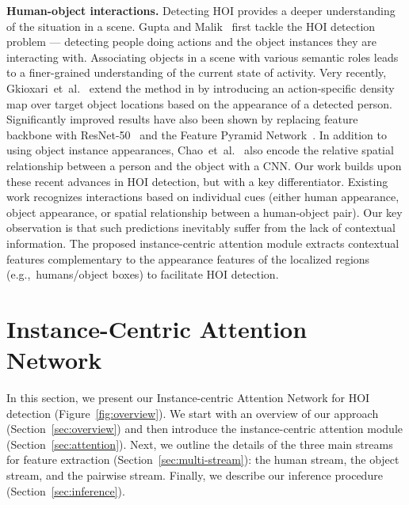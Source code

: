\documentclass{bmvc2k}
\def\etal{et~al.}			  \def\eg{e.g.,~}               \def\ie{i.e.,~}               \def\etc{etc}                 \def\cf{cf.~}                 \def\viz{viz.~}               \def\vs{vs.~}
\newlength\secmargin
\newcommand {\para}[1]{\vspace{1.5mm} \noindent \textbf{#1}}
\newcommand{\secref}[1]{Section~\ref{sec:#1}}
\newcommand{\figref}[1]{Figure~\ref{fig:#1}}
\begin{document}
\para{Human-object interactions.}
Detecting HOI provides a deeper understanding of the situation in a scene. 
Gupta and Malik~\cite{Gupta-SemanticRoleLabeling} first tackle the HOI detection problem --- detecting people doing actions and the object instances they are interacting with.
Associating objects in a scene with various semantic roles leads to a finer-grained understanding of the current state of activity. 
Very recently, Gkioxari~\etal~\cite{Gkioxari-CVPR-InteractNet} extend the method in \cite{Gupta-SemanticRoleLabeling} by introducing an action-specific density map over target object locations based on the appearance of a detected person.
Significantly improved results have also been shown by replacing feature backbone with ResNet-50~\cite{He-CVPR-ResNet} and the Feature Pyramid Network~\cite{Lin-CVPR-Pyramid}.
In addition to using object instance appearances, Chao~\etal~\cite{Chao-WACV-HOI} also encode the relative spatial relationship between a person and the object with a CNN.
Our work builds upon these recent advances in HOI detection, but with a key differentiator.
Existing work recognizes interactions based on individual cues (either human appearance, object appearance, or spatial relationship between a human-object pair).
Our key observation is that such predictions inevitably suffer from the lack of contextual information.
The proposed instance-centric attention module extracts contextual features complementary to the appearance features of the localized regions (\eg humans/object boxes) to facilitate HOI detection.


 \vspace{\secmargin}
\section{Instance-Centric Attention Network}
\label{sec:approach}
\vspace{\secmargin}

In this section, we present our Instance-centric Attention Network for HOI detection (\figref{overview}).
We start with an overview of our approach (\secref{overview}) and then introduce the instance-centric attention module (\secref{attention}). 
Next, we outline the details of the three main streams for feature extraction (\secref{multi-stream}): the human stream, the object stream, and the pairwise stream.
Finally, we describe our inference procedure (\secref{inference}).
\end{document}
